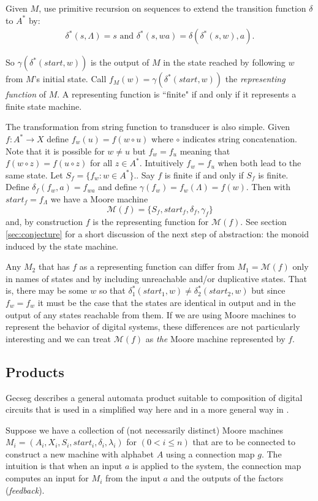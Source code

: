 \documentclass[runningheads,letter]{llncs}
\newcommand{\set}[1]{\{#1\}}
\newcommand{\ess}{\Lambda}
\newcommand{\Ma}{\mathcal{M}}
\newcommand{\st}{\mathit{start}}
\newcommand{\conc}{\circ}
\begin{document}
Given $M$, use primitive recursion on sequences to 
extend  the transition function $\delta$ to $A^*$ by:
\begin{eqnarray}
\delta^*(s,\ess)=s \mbox{ and } \delta^*(s,wa)=\delta(\delta^*(s,w),a).
\end{eqnarray}

So $\gamma(\delta^*(\st,w))$ is
the output of $M$ in the state reached by following $w$ from $M$'s initial
state.
Call $f_M(w) =\gamma(\delta^*(\st,w))$ the 
\emph{representing function} of $M$. A representing function is ``finite" if
and only if it represents a finite state machine. 

The transformation from string function to transducer is also simple.
Given $f:A^*\to X$ define  $f_w(u) = f(w\circ u)$ where $\circ$ indicates string
concatenation. Note that it is possible for $w\neq u$ but $f_w=f_u$ meaning
that  $f(w\conc z)=f(u\conc z)$ for all
$z\in A^*$.  Intuitively $f_w = f_u$ when both lead to the same state. Let $S_f=\set{f_w:w\in A^*}.$.
Say $f$ is finite if and only if $S_f$ is finite. Define
$\delta_f(f_w,a)=f_{wa}$ and define $\gamma(f_w)= f_w(\ess) = f(w)$. Then
with $\st_f = f_\ess$ we have a Moore machine
\[\Ma(f)=\set{S_f,\st_f,\delta_f,\gamma_f}\]
and, by construction $f$ is the representing function for $\Ma(f)$. See section \ref{sec:conjecture} for a short
discussion of the next step of abstraction: the monoid induced by the state machine.

Any $M_2$ that has $f$ as a representing function can differ
from $M_1=\Ma(f)$ only in names of states and by including unreachable and/or
duplicative states. That is, there may be some  $w$ so that
$\delta_1^*(\st_1,w) \neq \delta_2^*(\st_2,w)$ but since $f_w= f_w$ it must
be the case that the states are identical in output and in the output of any
states reachable from them. If we are using Moore machines to
represent the behavior of digital systems, these differences are not particularly interesting and we can treat $\Ma(f)$ as \emph{the} Moore machine represented
by $f$.

\subsection{Products}

Gecseg\cite{Gecseg}  describes a general automata product suitable to composition of digital circuits that is used in a simplified way here and in a more
general way in \cite{yodaikenprpresent}.

Suppose we have a collection of (not necessarily distinct) Moore machines
$M_i=(A_i,X_i,S_i,\st_i,\delta_i,\lambda_i)$ for $(0 < i \leq n)$
that are to be connected to construct a new machine with alphabet $A$ 
using a connection map $g$.
The intuition is that when an input $a$ is applied to the system,
the connection map computes an input for
$M_i$ from the input $a$ and the outputs of the factors (\emph{feedback}).
\end{document}
